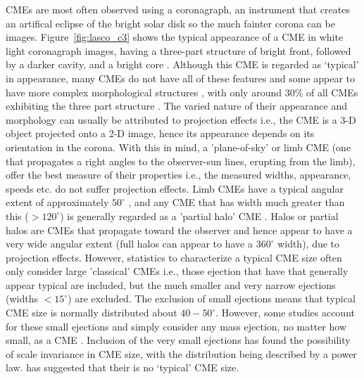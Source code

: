 CMEs are most often observed using a coronagraph, an instrument that creates an artifical eclipse of the bright solar disk so the much fainter corona can be images. Figure~\ref{fig:lasco_c3} shows the typical appearance of a CME in white light coronagraph images, having a three-part structure of bright front, followed by a darker cavity, and a bright core \citep{illing1985}. Although this CME is regarded as \textquoteleft typical' in appearance, many CMEs do not have all of these features and some appear to have more complex morphological structures \citep{pick2006}, with only around 30\% of all CMEs exhibiting the three part structure \citep{webbHu1987}. The varied nature of their appearance and morphology can usually be attributed to projection effects \citep{burk2004} i.e., the CME is a 3-D object projected onto a 2-D image, hence its appearance depends on its orientation in the corona. With this in mind, a 'plane-of-sky' or limb CME (one that propagates a right angles to the observer-sun lines, erupting from the limb), offer the best measure of their properties i.e., the measured widths, appearance, speeds etc. do not suffer projection effects. Limb CMEs have a typical angular extent of approximately $50^{\circ}$ \citep{burk2004}, and any CME that has width much greater than this ($>120^{\circ}$) is generally regarded as a 'partial halo' CME \citep{yashiro2004}. Halos or partial halos are CMEs that propagate toward the observer and hence appear to have a very wide angular extent (full halos can appear to have a $360^{\circ}$ width), due to projection effects. However, statistics to characterize a typical CME size often only consider large 'classical' CMEs i.e., those ejection that have that generally appear typical are included, but the much smaller and very narrow ejections (widths $<15^{\circ}$) are excluded. The exclusion of small ejections means that typical CME size is normally distributed about $40-50^{\circ}$. However, some studies account for these small ejections and simply consider any mass ejection, no matter how small, as a CME \citep{robb2009}. Inclusion of the very small ejections has found the possibility of scale invariance in CME size, with the distribution being described by a power law. \citet{robb2009} has suggested that their is no \textquoteleft typical' CME size.
